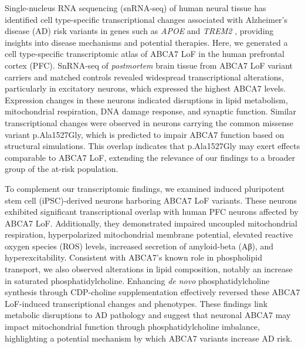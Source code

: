 Single-nucleus RNA sequencing (snRNA-seq) of human neural tissue has identified cell type-specific transcriptional changes associated with Alzheimer's disease (AD) risk variants in genes such as \textit{APOE} and \textit{TREM2} \cite{Brase2023-xk,Blanchard2022-cf,Sayed2021-qn,Wamsley2024-zm,Kamath2022-if}, providing insights into disease mechanisms and potential therapies. Here, we generated a cell type-specific transcriptomic atlas of ABCA7 LoF in the human prefrontal cortex (PFC). SnRNA-seq of \textit{postmortem} brain tissue from ABCA7 LoF variant carriers and matched controls revealed widespread transcriptional alterations, particularly in excitatory neurons, which expressed the highest ABCA7 levels. Expression changes in these neurons indicated disruptions in lipid metabolism, mitochondrial respiration, DNA damage response, and synaptic function. Similar transcriptional changes were observed in neurons carrying the common missense variant p.Ala1527Gly, which is predicted to impair ABCA7 function based on structural simulations. This overlap indicates that p.Ala1527Gly may exert effects comparable to ABCA7 LoF, extending the relevance of our findings to a broader group of the at-risk population.

To complement our transcriptomic findings, we examined induced pluripotent stem cell (iPSC)-derived neurons harboring ABCA7 LoF variants. These neurons exhibited significant transcriptional overlap with human PFC neurons affected by ABCA7 LoF. Additionally, they demonstrated impaired uncoupled mitochondrial respiration, hyperpolarized mitochondrial membrane potential, elevated reactive oxygen species (ROS) levels, increased secretion of amyloid-beta (Aβ), and hyperexcitability. Consistent with ABCA7's known role in phospholipid transport, we also observed alterations in lipid composition, notably an increase in saturated phosphatidylcholine. Enhancing \textit{de novo} phosphatidylcholine synthesis through CDP-choline supplementation effectively reversed these ABCA7 LoF-induced transcriptional changes and phenotypes. These findings link metabolic disruptions to AD pathology and suggest that neuronal ABCA7 may impact mitochondrial function through phosphatidylcholine imbalance, highlighting a potential mechanism by which ABCA7 variants increase AD risk.

